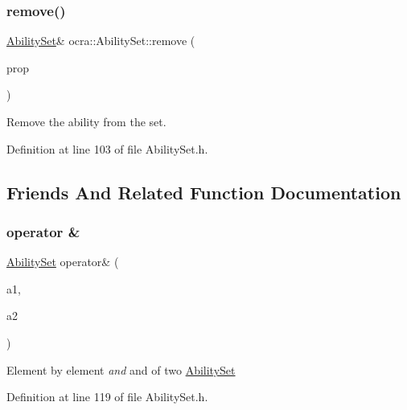 \subsubsection{\texorpdfstring{remove()}{remove()}}
{\footnotesize\ttfamily \hyperlink{classocra_1_1AbilitySet}{Ability\+Set}\& ocra\+::\+Ability\+Set\+::remove (\begin{DoxyParamCaption}\item[{\hyperlink{namespaceocra_a40ddbec106a6034cd2047bba9945b568}{e\+Function\+Ability}}]{prop }\end{DoxyParamCaption})\hspace{0.3cm}{\ttfamily [inline]}}

Remove the ability from the set. 

Definition at line 103 of file Ability\+Set.\+h.



\subsection{Friends And Related Function Documentation}
\hypertarget{classocra_1_1AbilitySet_a186c9af3e53f43c03761eae7457a5502}{}\label{classocra_1_1AbilitySet_a186c9af3e53f43c03761eae7457a5502} 
\subsubsection{\texorpdfstring{operator \&}{operator \&}}
{\footnotesize\ttfamily \hyperlink{classocra_1_1AbilitySet}{Ability\+Set} operator\& (\begin{DoxyParamCaption}\item[{const \hyperlink{classocra_1_1AbilitySet}{Ability\+Set}}]{a1,  }\item[{const \hyperlink{classocra_1_1AbilitySet}{Ability\+Set}}]{a2 }\end{DoxyParamCaption})\hspace{0.3cm}{\ttfamily [friend]}}

Element by element {\itshape and} and  of two \hyperlink{classocra_1_1AbilitySet}{Ability\+Set} 

Definition at line 119 of file Ability\+Set.\+h.

\hypertarget{classocra_1_1AbilitySet_a31839dcdc5a95a8f78f786f2488618a6}{}\label{classocra_1_1AbilitySet_a31839dcdc5a95a8f78f786f2488618a6} 
